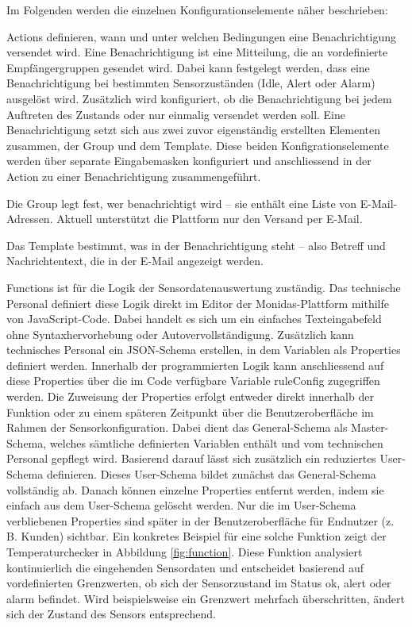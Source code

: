 Im Folgenden werden die einzelnen Konfigurationselemente näher beschrieben:

Actions definieren, wann und unter welchen Bedingungen eine Benachrichtigung versendet wird. Eine Benachrichtigung ist eine Mitteilung, die an vordefinierte Empfängergruppen gesendet wird. Dabei kann festgelegt werden, dass eine Benachrichtigung bei bestimmten Sensorzuständen (Idle, Alert oder Alarm) ausgelöst wird. Zusätzlich wird konfiguriert, ob die Benachrichtigung bei jedem Auftreten des Zustands oder nur einmalig versendet werden soll. Eine Benachrichtigung setzt sich aus zwei zuvor eigenständig erstellten Elementen zusammen, der Group und dem Template. Diese beiden Konfigrationselemente werden über separate Eingabemasken konfiguriert und anschliessend in der Action zu einer Benachrichtigung zusammengeführt.

Die Group legt fest, wer benachrichtigt wird – sie enthält eine Liste von E-Mail-Adressen. Aktuell unterstützt die Plattform nur den Versand per E-Mail.

Das Template bestimmt, was in der Benachrichtigung steht – also Betreff und Nachrichtentext, die in der E-Mail angezeigt werden.

Functions ist für die Logik der Sensordatenauswertung zuständig. Das technische Personal definiert diese Logik direkt im Editor der Monidas-Plattform mithilfe von JavaScript-Code. Dabei handelt es sich um ein einfaches Texteingabefeld ohne Syntaxhervorhebung oder Autovervollständigung. Zusätzlich kann technisches Personal ein JSON-Schema erstellen, in dem Variablen als Properties definiert werden. Innerhalb der programmierten Logik kann anschliessend auf diese Properties über die im Code verfügbare Variable ruleConfig zugegriffen werden. Die Zuweisung der Properties erfolgt entweder direkt innerhalb der Funktion oder zu einem späteren Zeitpunkt über die Benutzeroberfläche im Rahmen der Sensorkonfiguration. Dabei dient das General-Schema als Master-Schema, welches sämtliche definierten Variablen enthält und vom technischen Personal gepflegt wird. Basierend darauf lässt sich zusätzlich ein reduziertes User-Schema definieren. Dieses User-Schema bildet zunächst das General-Schema vollständig ab. Danach können einzelne Properties entfernt werden, indem sie einfach aus dem User-Schema gelöscht werden. Nur die im User-Schema verbliebenen Properties sind später in der Benutzeroberfläche für Endnutzer (z. B. Kunden) sichtbar. Ein konkretes Beispiel für eine solche Funktion zeigt der Temperaturchecker in Abbildung \ref{fig:function}. Diese Funktion analysiert kontinuierlich die eingehenden Sensordaten und entscheidet basierend auf vordefinierten Grenzwerten, ob sich der Sensorzustand im Status ok, alert oder alarm befindet. Wird beispielsweise ein Grenzwert mehrfach überschritten, ändert sich der Zustand des Sensors entsprechend.

